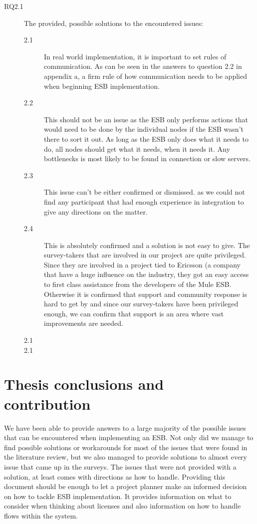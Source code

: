 \documentclass{llncs}
\begin{document}
\begin{description}
\item[RQ2.1] The provided, possible solutions to the encountered issues:
\begin{description}
\item[2.1] In real world implementation, it is important to set rules of communication. As can be seen in the answers to question 2.2 in appendix a, a firm rule of how communication needs to be applied when beginning ESB implementation. 
\item[2.2] This should not be an issue as the ESB only performs actions that would need to be done by the individual nodes if the ESB wasn’t there to sort it out. As long as the ESB only does what it needs to do, all nodes should get what it needs, when it needs it. Any bottlenecks is most likely to be found in connection or slow servers.
\item[2.3] This issue can’t be either confirmed or dismissed. as we could not find any participant that had enough experience in integration to give any directions on the matter.
\item[2.4] This is absolutely confirmed and a solution is not easy to give. The survey-takers that are involved in our project are quite privileged. Since they are involved in a project tied to Ericsson (a company that have a huge influence on the industry, they got an easy access to first class assistance from the developers of the Mule ESB. Otherwise it is confirmed that support and community response is hard to get by and since our survey-takers have been privileged enough, we can confirm that support is an area where vast improvements are needed. 
\item[2.1]
\item[2.1]
\end{description}


\end{description}

\section{Thesis conclusions and contribution}
We have been able to provide answers to a large majority of the possible issues that can be encountered when implementing an ESB. Not only did we manage to find possible solutions or workarounds for most of the issues that were found in the literature review, but we also managed to provide solutions to almost every issue that came up in the surveys.
The issues that were not provided with a solution, at least comes with directions as how to handle. Providing this document should be enough to let a project planner make an informed decision on how to tackle ESB implementation. It provides information on what to consider when thinking about licenses and also information on how to handle flows within the system.
\end{document}
